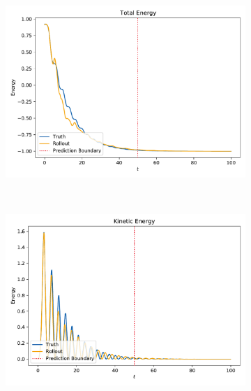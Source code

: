		\begin{figure}
			\centering
			\begin{subfigure}{0.7\linewidth}
				\includegraphics[width=\linewidth]{figures/results/pendulum-damped/run-latent-dim-10/energy-R110-N0-total.pdf}
			\end{subfigure} \\
			\begin{subfigure}{0.5\linewidth}
				\centering
				\includegraphics[width=\linewidth]{figures/results/pendulum-damped/run-latent-dim-10/energy-R110-N0-kinetic.pdf}
			\end{subfigure}%
			~
			\begin{subfigure}{0.5\linewidth}
				\centering

\end{subfigure}
\end{figure}
